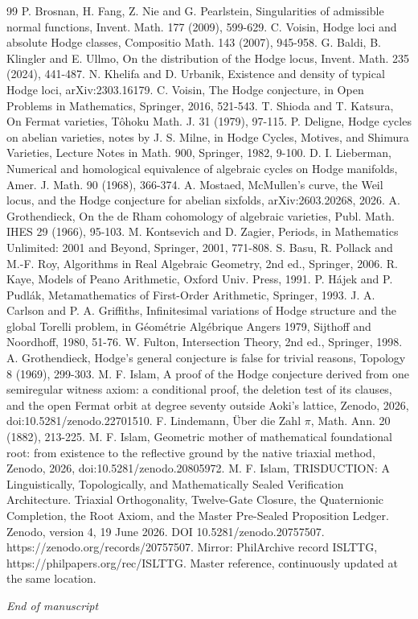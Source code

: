\documentclass[10pt,twocolumn]{article}
\begin{document}
\begin{thebibliography}{99}
 P. Brosnan, H. Fang, Z. Nie and G. Pearlstein, Singularities of admissible normal functions, Invent. Math. 177 (2009), 599-629.
 C. Voisin, Hodge loci and absolute Hodge classes, Compositio Math. 143 (2007), 945-958.
 G. Baldi, B. Klingler and E. Ullmo, On the distribution of the Hodge locus, Invent. Math. 235 (2024), 441-487.
 N. Khelifa and D. Urbanik, Existence and density of typical Hodge loci, arXiv:2303.16179.
 C. Voisin, The Hodge conjecture, in Open Problems in Mathematics, Springer, 2016, 521-543.
 T. Shioda and T. Katsura, On Fermat varieties, Tôhoku Math. J. 31 (1979), 97-115.
 P. Deligne, Hodge cycles on abelian varieties, notes by J. S. Milne, in Hodge Cycles, Motives, and Shimura Varieties, Lecture Notes in Math. 900, Springer, 1982, 9-100.
 D. I. Lieberman, Numerical and homological equivalence of algebraic cycles on Hodge manifolds, Amer. J. Math. 90 (1968), 366-374.
 A. Mostaed, McMullen's curve, the Weil locus, and the Hodge conjecture for abelian sixfolds, arXiv:2603.20268, 2026.
 A. Grothendieck, On the de Rham cohomology of algebraic varieties, Publ. Math. IHES 29 (1966), 95-103.
 M. Kontsevich and D. Zagier, Periods, in Mathematics Unlimited: 2001 and Beyond, Springer, 2001, 771-808.
 S. Basu, R. Pollack and M.-F. Roy, Algorithms in Real Algebraic Geometry, 2nd ed., Springer, 2006.
 R. Kaye, Models of Peano Arithmetic, Oxford Univ. Press, 1991.
 P. Hájek and P. Pudlák, Metamathematics of First-Order Arithmetic, Springer, 1993.
 J. A. Carlson and P. A. Griffiths, Infinitesimal variations of Hodge structure and the global Torelli problem, in Géométrie Algébrique Angers 1979, Sijthoff and Noordhoff, 1980, 51-76.
 W. Fulton, Intersection Theory, 2nd ed., Springer, 1998.
 A. Grothendieck, Hodge's general conjecture is false for trivial reasons, Topology 8 (1969), 299-303.
 M. F. Islam, A proof of the Hodge conjecture derived from one semiregular witness axiom: a conditional proof, the deletion test of its clauses, and the open Fermat orbit at degree seventy outside Aoki's lattice, Zenodo, 2026, doi:10.5281/zenodo.22701510.
 F. Lindemann, Über die Zahl $\pi$, Math. Ann. 20 (1882), 213-225.
 M. F. Islam, Geometric mother of mathematical foundational root: from existence to the reflective ground by the native triaxial method, Zenodo, 2026, doi:10.5281/zenodo.20805972.
 M. F. Islam, TRISDUCTION: A Linguistically, Topologically, and Mathematically Sealed Verification Architecture. Triaxial Orthogonality, Twelve-Gate Closure, the Quaternionic Completion, the Root Axiom, and the Master Pre-Sealed Proposition Ledger. Zenodo, version 4, 19 June 2026. DOI 10.5281/zenodo.20757507. https://zenodo.org/records/20757507. Mirror: PhilArchive record ISLTTG, https://philpapers.org/rec/ISLTTG. Master reference, continuously updated at the same location.
\end{thebibliography}

\begin{center}\textit{End of manuscript}\end{center}
\end{document}
